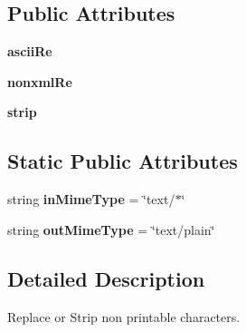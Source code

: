 \subsection*{Public Attributes}
\begin{DoxyCompactItemize}
\item 
\hypertarget{classcheshire3_1_1pre_parser_1_1_printable_only_pre_parser_ab4d3dff103fef469beac199db798bab5}{{\bfseries ascii\-Re}}\label{classcheshire3_1_1pre_parser_1_1_printable_only_pre_parser_ab4d3dff103fef469beac199db798bab5}

\item 
\hypertarget{classcheshire3_1_1pre_parser_1_1_printable_only_pre_parser_a59f8c95e8302144244d817270087cf66}{{\bfseries nonxml\-Re}}\label{classcheshire3_1_1pre_parser_1_1_printable_only_pre_parser_a59f8c95e8302144244d817270087cf66}

\item 
\hypertarget{classcheshire3_1_1pre_parser_1_1_printable_only_pre_parser_ae5d8a950a3a4b50efb95fab234ae2746}{{\bfseries strip}}\label{classcheshire3_1_1pre_parser_1_1_printable_only_pre_parser_ae5d8a950a3a4b50efb95fab234ae2746}

\end{DoxyCompactItemize}
\subsection*{Static Public Attributes}
\begin{DoxyCompactItemize}
\item 
\hypertarget{classcheshire3_1_1pre_parser_1_1_printable_only_pre_parser_aec9321a4db2bbcea951a09731a82a916}{string {\bfseries in\-Mime\-Type} = \char`\"{}text/$\ast$\char`\"{}}\label{classcheshire3_1_1pre_parser_1_1_printable_only_pre_parser_aec9321a4db2bbcea951a09731a82a916}

\item 
\hypertarget{classcheshire3_1_1pre_parser_1_1_printable_only_pre_parser_ae2fee1140bf59274611a86d41bf5c893}{string {\bfseries out\-Mime\-Type} = \char`\"{}text/plain\char`\"{}}\label{classcheshire3_1_1pre_parser_1_1_printable_only_pre_parser_ae2fee1140bf59274611a86d41bf5c893}

\end{DoxyCompactItemize}


\subsection{Detailed Description}
\begin{DoxyVerb}Replace or Strip non printable characters.\end{DoxyVerb}
 

